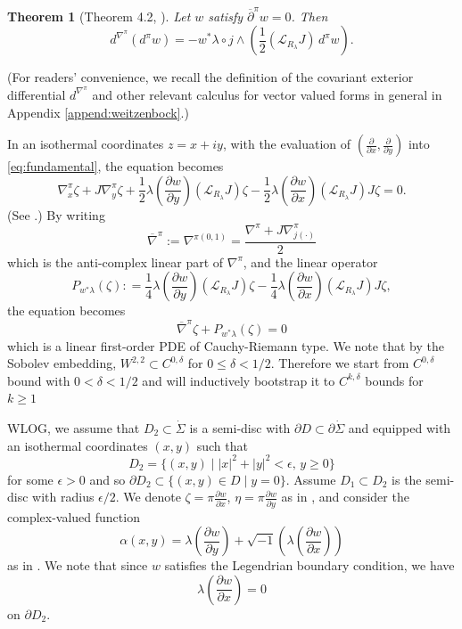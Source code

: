 \documentclass[reqno]{amsart}
\newcommand{\del}{\partial}
\newcommand{\be}{\begin{equation}}
\newcommand{\ee}{\end{equation}}
\theoremstyle{theorem}
\newtheorem{thm}{Theorem}[section]
\theoremstyle{definition}
\numberwithin{equation}{section}
\def\delbar{{\overline \partial}}
\def\delbar{{\overline \partial}}
\def\CL{{\mathcal L}}
\begin{document}
\begin{thm}[Theorem 4.2, \cite{oh-wang:connection}]
Let $w$ satisfy $\delbar^\pi w=0$. Then
\be\label{eq:fundamental}
d^{\nabla^\pi}(d^\pi w) = -w^*\lambda\circ j \wedge\left( \frac{1}{2}(\CL_{R_\lambda}J)\, d^\pi w\right).
\ee
\end{thm}
(For readers' convenience, we recall the definition of the covariant exterior differential
$d^{\nabla^\pi}$ and other relevant calculus for vector valued forms in general
in Appendix \ref{append:weitzenbock}.)

In an isothermal coordinates $z = x+iy$, with the evaluation of $(\frac{\del}{\del x},\frac{\del}{\del y})$
into \eqref{eq:fundamental}, the equation becomes
$$
\nabla_x^\pi \zeta + J \nabla_y^\pi \zeta
+ \frac{1}{2} \lambda\left(\frac{\del w}{\del y}\right)(\CL_{R_\lambda}J)\zeta - \frac{1}{2}
\lambda\left(\frac{\del w}{\del x}\right)(\CL_{R_\lambda}J)J\zeta =0.
$$
(See \cite[Corollary 4.3]{oh-wang:connection}.) By writing
$$
\overline \nabla^\pi := \nabla^{\pi(0,1)} = \frac{\nabla^\pi + J \nabla^\pi_{j(\cdot)}}{2}
$$
which is the anti-complex linear part of $\nabla^\pi$, and the linear operator
$$
P_{w^*\lambda}(\zeta): = \frac{1}{4} \lambda\left(\frac{\del w}{\del y}\right)(\CL_{R_\lambda}J)\zeta - \frac{1}{4}
\lambda\left(\frac{\del w}{\del x}\right)(\CL_{R_\lambda}J)J\zeta,
$$
the equation becomes
\be\label{eq:nablabar-P}
\overline \nabla^\pi \zeta + P_{w^*\lambda}(\zeta) = 0
\ee
which is a linear first-order PDE of Cauchy-Riemann type. We note that
by the Sobolev embedding, $ W^{2,2} \subset C^{0,\delta}$ for $0 \leq \delta < 1/2$.
Therefore we start from $C^{0,\delta}$ bound with $0 < \delta <1/2$ and will inductively bootstrap it to
$C^{k, \delta}$ bounds for $k \geq 1$


WLOG, we assume that $D_2 \subset \dot \Sigma$ is a semi-disc with $\del D \subset \del \dot \Sigma$
and equipped with an isothermal coordinates $(x,y)$ such that
$$
D_2 = \{ (x,y) \mid |x|^2 + |y|^2 < \epsilon, \, y \geq 0\}
$$
for some $\epsilon > 0$
and so $\del D_2 \subset \{(x,y) \in D \mid y = 0\}$. Assume $D_1 \subset D_2$
is the semi-disc with radius $\epsilon /2$.
We denote $\zeta = \pi \frac{\del w}{\del x}$, $\eta = \pi \frac{\del w}{\del y}$
as in \cite{oh-wang:CR-map1}, and consider the complex-valued function
\be\label{eq:alpha}
\alpha(x,y) = \lambda\left(\frac{\del w}{\del y}\right)
+ \sqrt{-1}\left(\lambda\left(\frac{\del w}{\del x}\right)\right)
\ee
as in \cite[Subsection 11.5]{oh-wang:CR-map2}. We note that since $w$ satisfies the
Legendrian boundary condition, we have
\be\label{eq:lambda(delw)=0}
\lambda\left(\frac{\del w}{\del x}\right) = 0
\ee
on $\del D_2$.
\end{document}
